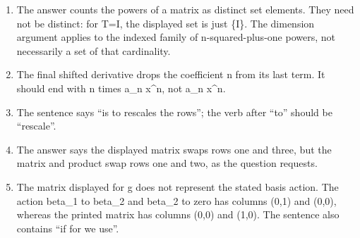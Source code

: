 \begin{enumerate}
\item The answer counts the powers of a matrix as distinct set elements. They need not be distinct: for T=I, the displayed set is just \{I\}. The dimension argument applies to the indexed family of n-squared-plus-one powers, not necessarily a set of that cardinality.
\item The final shifted derivative drops the coefficient n from its last term. It should end with n times a\_n x\textasciicircum{}n, not a\_n x\textasciicircum{}n.
\item The sentence says “is to rescales the rows”; the verb after “to” should be “rescale”.
\item The answer says the displayed matrix swaps rows one and three, but the matrix and product swap rows one and two, as the question requests.
\item The matrix displayed for g does not represent the stated basis action. The action beta\_1 to beta\_2 and beta\_2 to zero has columns (0,1) and (0,0), whereas the printed matrix has columns (0,0) and (1,0). The sentence also contains “if for we use”.
\end{enumerate}
